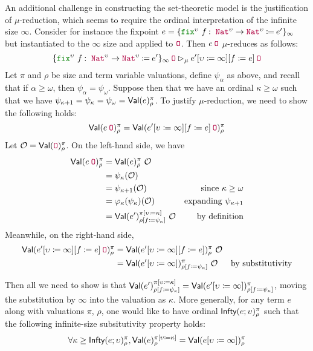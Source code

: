 An additional challenge in constructing the set-theoretic model is
the justification of $\mu$-reduction, which seems to require
the ordinal interpretation of the infinite size $\infty$.
Consider for instance the fixpoint
$e = \fixE{\upsilon}{f}{\Nat^\upsilon \rightarrow \Nat^\upsilon}{e'}{\infty}$
but instantiated to the $\infty$ size and applied to $\Zero$.
Then $\app{e}{\Zero}$ $\mu$-reduces as follows:
$$\app{\fixE{\upsilon}{f}{\Nat^\upsilon \rightarrow \Nat^\upsilon}{e'}{\infty}}{\Zero}
\rhd_\mu
\app{\subst{\subst{e'}{\upsilon}{\infty}}{f}{e}}{\Zero}$$
Let $\pi$ and $\rho$ be size and term variable valuations,
define $\psi_\alpha$ as above, and recall that if $\alpha \geq \omega$,
then $\psi_\alpha = \psi_\omega$.
Suppose then that we have an ordinal $\kappa \geq \omega$ such that we have
$\psi_{\kappa+1} = \psi_\kappa = \psi_\omega = \textsf{Val}(e)_\rho^\pi$.
To justify $\mu$-reduction, we need to show the following holds:
$$\Val(\app{e}{\Zero})_\rho^\pi = \Val(\app{\subst{\subst{e'}{\upsilon}{\infty}}{f}{e}}{\Zero})_\rho^\pi$$
Let $\mathcal{O} = \Val(\Zero)_\rho^\pi$.
On the left-hand side, we have
\begin{align*}
  \Val(\app{e}{\Zero})_\rho^\pi &= \Val(e)_\rho^\pi ~ \mathcal{O} \\
  &= \psi_{\kappa}(\mathcal{O}) \\
  &= \psi_{\kappa+1}(\mathcal{O}) &\text{since $\kappa \geq \omega$} \\
  &= \phi_\kappa(\psi_\kappa)(\mathcal{O}) &\text{expanding $\psi_{\kappa+1}$} \\
  &= \Val(e')_{\subst{\rho}{f}{\psi_\kappa}}^{\subst{\pi}{\upsilon}{\kappa}} ~ \mathcal{O} &\text{by definition}
\end{align*}
Meanwhile, on the right-hand side,
\begin{align*}
  \Val(\app{\subst{\subst{e'}{\upsilon}{\infty}}{f}{e}}{\Zero})_\rho^\pi
  &= \Val(\subst{\subst{e'}{\upsilon}{\infty}}{f}{e})_\rho^\pi ~ \mathcal{O} \\
  &= \Val(\subst{e'}{\upsilon}{\infty})_{\subst{\rho}{f}{\psi_\kappa}}^\pi ~ \mathcal{O} &\text{by substitutivity}
\end{align*}

Then all we need to show is that
$\textsf{Val}(e')_{\rho [f \coloneqq \psi_\kappa]}^{\pi [\upsilon \coloneqq \kappa]}
= \textsf{Val}(e' [\upsilon \coloneqq \infty])_{\rho [f \coloneqq \psi_\kappa]}^\pi$,
moving the substitution by $\infty$ into the valuation as $\kappa$.
More generally, for any term $e$ along with valuations $\pi$, $\rho$,
one would like to have ordinal $\textsf{Infty}(e; \upsilon)_\rho^\pi$ such that the
following infinite-size subsitutivity property holds:
$$\forall \kappa \geq \textsf{Infty}(e; \upsilon)_\rho^\pi,
  \textsf{Val}(e)_{\rho}^{\pi [\upsilon \coloneqq \kappa]}
  = \textsf{Val}(e [\upsilon \coloneqq \infty])_{\rho}^{\pi}$$

